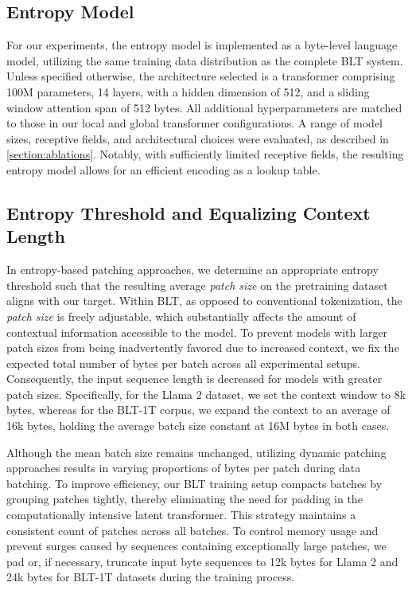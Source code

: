 \subsection{Entropy Model} For our experiments, the entropy model is implemented as a byte-level language model, utilizing the same training data distribution as the complete {\textsc BLT} system. Unless specified otherwise, the architecture selected is a transformer comprising 100M parameters, 14 layers, with a hidden dimension of 512, and a sliding window attention span of 512 bytes. All additional hyperparameters are matched to those in our local and global transformer configurations. A range of model sizes, receptive fields, and architectural choices were evaluated, as described in \autoref{section:ablations}. Notably, with sufficiently limited receptive fields, the resulting entropy model allows for an efficient encoding as a lookup table.

\subsection{Entropy Threshold and Equalizing Context Length} In entropy-based patching approaches, we determine an appropriate entropy threshold such that the resulting average \textit{patch size} on the pretraining dataset aligns with our target. Within {\textsc BLT}, as opposed to conventional tokenization, the \textit{patch size} is freely adjustable, which substantially affects the amount of contextual information accessible to the model. To prevent models with larger patch sizes from being inadvertently favored due to increased context, we fix the expected total number of bytes per batch across all experimental setups. Consequently, the input sequence length is decreased for models with greater patch sizes. Specifically, for the Llama 2 dataset, we set the context window to 8k bytes, whereas for the {\textsc BLT}-1T corpus, we expand the context to an average of 16k bytes, holding the average batch size constant at 16M bytes in both cases.

Although the mean batch size remains unchanged, utilizing dynamic patching approaches results in varying proportions of bytes per patch during data batching. To improve efficiency, our {\textsc BLT} training setup compacts batches by grouping patches tightly, thereby eliminating the need for padding in the computationally intensive latent transformer. This strategy maintains a consistent count of patches across all batches. To control memory usage and prevent surges caused by sequences containing exceptionally large patches, we pad or, if necessary, truncate input byte sequences to 12k bytes for Llama 2 and 24k bytes for {\textsc BLT}-1T datasets during the training process.

